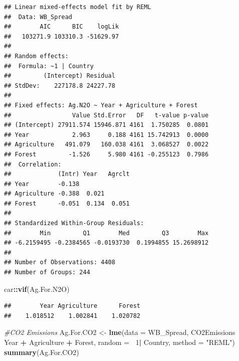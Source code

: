 \documentclass[12pt,]{article}
\newenvironment{Shaded}{\begin{snugshade}}{\end{snugshade}}
\newcommand{\KeywordTok}[1]{\textcolor[rgb]{0.13,0.29,0.53}{\textbf{#1}}}
\newcommand{\DataTypeTok}[1]{\textcolor[rgb]{0.13,0.29,0.53}{#1}}
\newcommand{\DecValTok}[1]{\textcolor[rgb]{0.00,0.00,0.81}{#1}}
\newcommand{\StringTok}[1]{\textcolor[rgb]{0.31,0.60,0.02}{#1}}
\newcommand{\CommentTok}[1]{\textcolor[rgb]{0.56,0.35,0.01}{\textit{#1}}}
\newcommand{\OperatorTok}[1]{\textcolor[rgb]{0.81,0.36,0.00}{\textbf{#1}}}
\newcommand{\NormalTok}[1]{#1}
\begin{document}
\begin{verbatim}
## Linear mixed-effects model fit by REML
##  Data: WB_Spread 
##        AIC      BIC    logLik
##   103271.9 103310.3 -51629.97
## 
## Random effects:
##  Formula: ~1 | Country
##         (Intercept) Residual
## StdDev:    227178.8 24227.78
## 
## Fixed effects: Ag.N2O ~ Year + Agriculture + Forest 
##                 Value Std.Error   DF   t-value p-value
## (Intercept) 27911.574 15946.871 4161  1.750285  0.0801
## Year            2.963     0.188 4161 15.742913  0.0000
## Agriculture   491.079   160.038 4161  3.068527  0.0022
## Forest         -1.526     5.980 4161 -0.255123  0.7986
##  Correlation: 
##             (Intr) Year   Agrclt
## Year        -0.138              
## Agriculture -0.388  0.021       
## Forest      -0.051  0.134  0.051
## 
## Standardized Within-Group Residuals:
##        Min         Q1        Med         Q3        Max 
## -6.2159495 -0.2384565 -0.0193730  0.1994855 15.2698912 
## 
## Number of Observations: 4408
## Number of Groups: 244
\end{verbatim}

\begin{Shaded}
\begin{Highlighting}[]
\NormalTok{car}\OperatorTok{::}\KeywordTok{vif}\NormalTok{(Ag.For.N2O)}
\end{Highlighting}
\end{Shaded}

\begin{verbatim}
##        Year Agriculture      Forest 
##    1.018512    1.002841    1.020782
\end{verbatim}

\begin{Shaded}
\begin{Highlighting}[]
\CommentTok{#CO2 Emissions}
\NormalTok{Ag.For.CO2 <-}\StringTok{ }\KeywordTok{lme}\NormalTok{(}\DataTypeTok{data =}\NormalTok{ WB_Spread,}
\NormalTok{                 CO2Emissions }\OperatorTok{~}\StringTok{ }\NormalTok{Year }\OperatorTok{+}\StringTok{ }\NormalTok{Agriculture }\OperatorTok{+}\StringTok{ }\NormalTok{Forest,}
                 \DataTypeTok{random =} \OperatorTok{~}\DecValTok{1}\OperatorTok{|}\StringTok{ }\NormalTok{Country,}
                 \DataTypeTok{method =} \StringTok{"REML"}\NormalTok{)}
\KeywordTok{summary}\NormalTok{(Ag.For.CO2)}
\end{Highlighting}
\end{Shaded}
\end{document}
